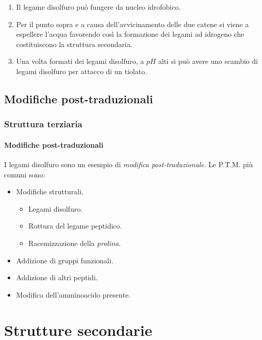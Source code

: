 \documentclass{beamer}
\begin{document}
\begin{frame}
  \begin{enumerate}
  \item  Il legame disolfuro può fungere da nucleo idrofobico.\pause
  \item  Per il punto sopra e a causa dell'avvicinamento delle due catene si viene a espellere l'acqua favorendo così la formazione dei legami ad idrogeno che costituiscono la struttura secondaria.\pause 
  \item  Una volta formati dei legami disolfuro, a $pH$ alti si può avere uno scambio di legami disolfuro per attacco di un tiolato.
\end{enumerate}
 

\end{frame}

\subsection{Modifiche post-traduzionali}
\begin{frame}  
  \frametitle{Struttura terziaria}
  \framesubtitle{Modifiche post-traduzionali}
  I legami disolfuro sono un esempio di \emph{modifica post-traduzionale}.
Le P.T.M. più comuni sono:
\begin{itemize}
 \item Modifiche strutturali.
\begin{itemize}
 \item Legami disolfuro.
\item Rottura del legame peptidico.
\item Racemizzazione della \emph{prolina}.
\end{itemize}
 

\item Addizione di gruppi funzionali.
\item Addizione di altri peptidi.
\item Modifica dell'amminoacido presente.
\end{itemize}
\end{frame}


\section{Strutture secondarie}
\end{document}
